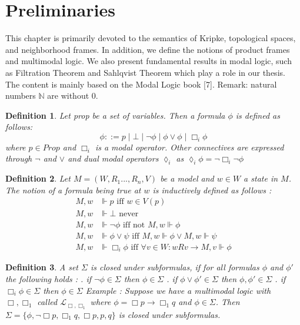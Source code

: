 \documentclass[12pt, a4paper]{scrartcl}
\newtheorem{definition}{Definition}[subsection]
\begin{document}
 \clearpage



\section{Preliminaries}
This chapter is primarily devoted to the semantics of Kripke, topological spaces, and neighborhood frames. 
In addition, we define the notions of product frames and multimodal logic. We also present fundamental results in modal logic, 
such as Filtration Theorem and Sahlqvist Theorem which play a role in our thesis. The content is mainly based on the Modal Logic book [7]. Remark: natural numbers $\mathbb{N}$ are without 0. 

\begin{definition}
Let prop be a set of variables. Then a formula $\phi$ is defined as follows:
$$\phi ::= p \mid \bot \mid \neg \phi \mid \phi \lor \phi \mid \Box_i \phi$$
where $p \in Prop$ and $\Box_i$ is a modal operator. Other connectives are expressed through $\neg$ and $\lor$ and 
dual modal operators $\lozenge_i$ as $\lozenge_i \phi = \neg \Box_i \neg \phi$
\end{definition}

\begin{definition}
    Let $M = (W,R_1...,R_n,V)$ be a model and $w \in W$ a state in $M$. The notion of a formula being true at $w$ is inductively defined as follows :
    \begin{align*}
        M, w &\Vdash p \mbox{ iff } w \in V(p) \\
        M, w &\Vdash \bot  \mbox{ never } \\
        M, w &\Vdash \neg \phi \mbox{ iff not } M, w \Vdash \phi \\ 
        M, w &\Vdash \phi \lor \psi \mbox{ iff } M,w \Vdash \phi \lor M,w \Vdash \psi \\
        M, w &\Vdash \Box_i \phi \mbox{ iff } \forall v \in W : wRv \rightarrow M, v \Vdash \phi
    \end{align*}

\end{definition}

\begin{definition}
    A set $\Sigma$ is closed under subformulas, if for all formulas $\phi$ and $\phi'$ the following holds :
    \newline {}. if $\neg \phi \in \Sigma$ then $\phi \in \Sigma$
    . if $\phi \lor \phi' \in \Sigma$ then $\phi, \phi' \in \Sigma$
    . if $\Box_i \phi \in \Sigma$ then $\phi \in \Sigma$
    \newline
    \newline
    Example : Suppose we have a multimodal logic with $\Box, \Box_1$ called $\mathcal{L}_{\Box, \Box_1}$ where $\phi = \Box p \rightarrow \Box_1 q$ and $\phi \in \Sigma$. Then $\Sigma = \{ \phi, \neg\Box p, \Box_1 q, \Box p, p, q\}$ is closed under
    subformulas.
\end{definition}
\end{document}
